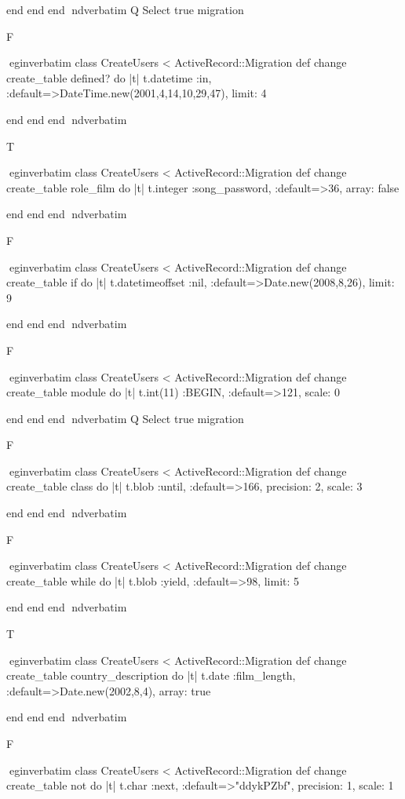     end 
  end 
end
nd{verbatim}
Q
 Select true migration

F

egin{verbatim}
 class CreateUsers < ActiveRecord::Migration 
  def change 
    create_table defined? do |t| 
      t.datetime :in, :default=>DateTime.new(2001,4,14,10,29,47), limit: 4
    
    end 
  end 
end
nd{verbatim}

T

egin{verbatim}
 class CreateUsers < ActiveRecord::Migration 
  def change 
    create_table role_film do |t| 
      t.integer :song_password, :default=>36, array: false
    
    end 
  end 
end
nd{verbatim}

F

egin{verbatim}
 class CreateUsers < ActiveRecord::Migration 
  def change 
    create_table if do |t| 
      t.datetimeoffset :nil, :default=>Date.new(2008,8,26), limit: 9
    
    end 
  end 
end
nd{verbatim}

F

egin{verbatim}
 class CreateUsers < ActiveRecord::Migration 
  def change 
    create_table module do |t| 
      t.int(11) :BEGIN, :default=>121, scale: 0
    
    end 
  end 
end
nd{verbatim}
Q
 Select true migration

F

egin{verbatim}
 class CreateUsers < ActiveRecord::Migration 
  def change 
    create_table class do |t| 
      t.blob :until, :default=>166, precision: 2, scale: 3
    
    end 
  end 
end
nd{verbatim}

F

egin{verbatim}
 class CreateUsers < ActiveRecord::Migration 
  def change 
    create_table while do |t| 
      t.blob :yield, :default=>98, limit: 5
    
    end 
  end 
end
nd{verbatim}

T

egin{verbatim}
 class CreateUsers < ActiveRecord::Migration 
  def change 
    create_table country_description do |t| 
      t.date :film_length, :default=>Date.new(2002,8,4), array: true
    
    end 
  end 
end
nd{verbatim}

F

egin{verbatim}
 class CreateUsers < ActiveRecord::Migration 
  def change 
    create_table not do |t| 
      t.char :next, :default=>"ddykPZbf", precision: 1, scale: 1
    
